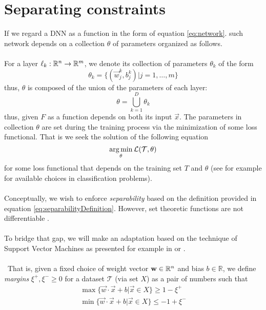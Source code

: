 
\section{Separating constraints}
If we regard a DNN as a function in the form of equation \ref{eq:network}. such network depends on a collection $\theta$ of parameters organized as follows. 
\\\\
For a layer $\ell_k:\mathbb{R}^{n}\rightarrow\mathbb{R}^{m}$, we denote its collection of parameters $\theta_k$ of the form
\begin{equation}
    \theta_k = \{(\vec{w}^k_j,b^k_j)|j=1,\ldots,m\}
\end{equation}
thus, $\theta$ is composed of the union of the parameters of each layer:
\begin{equation}
    \theta = \displaystyle\bigcup_{k=1}^D\theta_k
\end{equation}
thus, given $F$ as a function depends on both its input $\vec{x}$. The parameters in collection $\theta$ are set during the training process via the minimization of some loss functional. That is we seek the solution of the following equation
\begin{equation}\label{eq:generalOptimizationProblem}
\operatorname*{arg\,min}_{\theta} \mathcal{L}(\mathcal{T},\theta)
\end{equation}
for some loss functional that depends on the training set $T$ and $\theta$ (see for example \cite{LeCun06atutorial} for available choices in classification problems). 
\\\\
Conceptually, we wish to enforce \ReLU \emph{separability} based on the definition provided in equation \ref{eq:separabilityDefinition}. However, set theoretic functions are not differentiable \cite{Glorot10Initialization,lecun2015DeepLearningBig,munkres2000Topology}. 
\\\\
To bridge that gap, we will make an adaptation based on  the technique of Support Vector Machines as presented for example in  \cite{Burges1998TutorialOnSVMForPatternRecognition} or \cite{Hearst1998SupportVectorMachines}. 
\\\\\
That is, given a fixed choice of weight vector  $\mathbf{w}\in\mathbb{R}^{n}$ and bias $b\in\mathbb{R}$, we define \emph{margins} $\xi^{+},\xi^{-}\geq 0$ for a dataset $\mathcal{T}$ (via set $X$) as a pair of numbers such that
\begin{equation}\label{eq:basicConstraintFormulation}
\begin{array}{lcl}
    \max\{\vec{w}\cdot\vec{x}+b|\vec{x}\in X\}\geq 1-\xi^{+}\\
    \min\{\vec{w}\cdot\vec{x}+b|\vec{x}\in X\}\leq -1+\xi^{-}\\
\end{array}
\end{equation}
